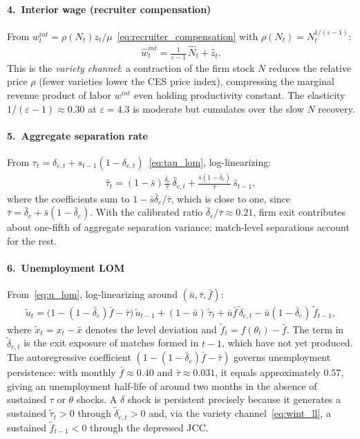 \documentclass[authoryear, review, 12pt]{elsarticle}
\begin{document}
\paragraph{4.\ Interior wage (recruiter compensation)}
From $w_t^{int} = \rho(N_t) z_t/\mu$~\eqref{eq:recruiter_compensation} with
$\rho(N_t) = N_t^{1/(\varepsilon-1)}$:
\begin{align}\label{eq:wint_ll}
    \hat{w}_t^{int} = \frac{1}{\varepsilon-1}\,\hat{N}_t + \hat{z}_t.
\end{align}
This is the \emph{variety channel}: a contraction of the firm stock $N$
reduces the relative price $\rho$ (fewer varieties lower the CES price
index), compressing the marginal revenue product of labor $w^{int}$ even
holding productivity constant.  The elasticity $1/(\varepsilon-1)\approx0.30$
at $\varepsilon=4.3$ is moderate but cumulates over the slow $N$ recovery.

\paragraph{5.\ Aggregate separation rate}
From $\tau_t = \delta_{e,t}+s_{t-1}(1-\delta_{e,t})$~\eqref{eq:tau_lom},
log-linearizing:
\begin{align}\label{eq:tau_ll}
    \hat\tau_t
    = (1-\bar{s})\frac{\bar\delta_e}{\bar\tau}\,\hat\delta_{e,t}
    + \frac{\bar{s}(1-\bar\delta_e)}{\bar\tau}\,\hat{s}_{t-1},
\end{align}
where the coefficients sum to $1-\bar{s}\bar\delta_e/\bar\tau$, which is close to one, since
$\bar\tau=\bar\delta_e+\bar{s}(1-\bar\delta_e)$.  With the calibrated ratio
$\bar\delta_e/\bar\tau\approx0.21$, firm exit contributes about one-fifth of
aggregate separation variance; match-level separations account for the rest.

\paragraph{6.\ Unemployment LOM}
From~\eqref{eq:u_lom}, log-linearizing around $(\bar{u},\bar\tau,\bar{f})$:
\begin{align}\label{eq:u_ll}
    \tilde{u}_{t}
    = \bigl(1-(1-\bar\delta_e)\bar{f}-\bar\tau\bigr)\,\tilde{u}_{t-1}
    + (1-\bar{u})\,\tilde\tau_t
    + \bar{u}\bar{f}\,\tilde\delta_{e,t}
    - \bar{u}(1-\bar\delta_e)\,\tilde{f}_{t-1},
\end{align}
where $\tilde{x}_t = x_t-\bar{x}$ denotes the level deviation and
$\tilde{f}_t = f(\theta_t)-\bar{f}$.  The term in
$\tilde\delta_{e,t}$ is the exit exposure of matches formed in
$t-1$, which have not yet produced. The autoregressive coefficient
$(1-(1-\bar\delta_e)\bar{f}-\bar\tau)$ governs unemployment persistence: with monthly
$\bar{f}\approx0.40$ and $\bar\tau\approx0.031$, it equals approximately
$0.57$, giving an unemployment half-life of around two months in the absence
of sustained $\tau$ or $\theta$ shocks.  A $\delta$ shock is persistent
precisely because it generates a sustained $\tilde\tau_t>0$ through
$\tilde\delta_{e,t}>0$ and, via the variety channel~\eqref{eq:wint_ll}, a
sustained $\tilde{f}_{t-1}<0$ through the depressed JCC.
\end{document}
